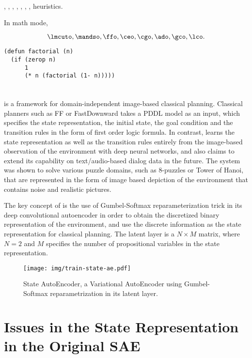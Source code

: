 \lmcuto, \mandso, \ffo, \ceo, \cgo, \ado, \gco, \lco heuristics.

In math mode,

\[
 \lmcuto, \mandso, \ffo, \ceo, \cgo, \ado, \gco, \lco.
\]

\begin{verbatim}
(defun factorial (n)
  (if (zerop n)
      1
      (* n (factorial (1- n)))))
\end{verbatim}

\section{\latentplanner}

\latentplanner \cite{Asai2018} is a framework for domain-independent image-based
classical planning.  Classical planners such as FF \cite{hoffmann01} or
FastDownward \cite{Helmert04} takes a PDDL model as an input, which
specifies the state representation, the initial state, the goal
condition and the transition rules in the form of first order logic
formula.  In contrast, \latentplanner learns the state representation as well as the transition rules
entirely from the image-based observation of the environment with deep neural networks, and also claims to
extend its capability on text/audio-based dialog data in the future.
The system was shown to solve various puzzle domains, such as 8-puzzles or Tower of Hanoi,
that are represented in the form of image based depiction of the environment that contains noise
and realistic pictures.

The key concept of \latentplanner is the use of Gumbel-Softmax
reparameterization trick in its deep convolutional autoencoder in order to obtain the
discretized binary representation of the environment, and use the
discrete information as the state representation for classical planning.
The latent layer is a $N\times M$ matrix, where $N=2$ and $M$ specifies
the number of propositional variables in the state representation.

\begin{figure}
 \texttt{[image: img/train-state-ae.pdf]}
 \caption{State AutoEncoder, a
 Variational AutoEncoder \cite{Kingma} using Gumbel-Softmax \cite{Jang} reparametrization in its
 latent layer.}
\end{figure}

\section{Issues in the State Representation in the Original SAE}

